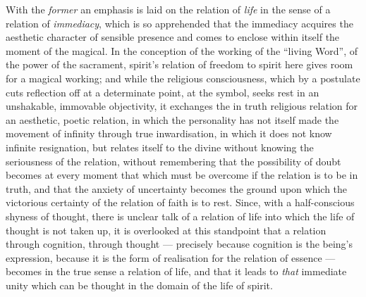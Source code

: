 \documentclass[12pt,a4paper]{book}
\begin{document}
With the \emph{former} an emphasis is laid on the relation of \emph{life} in
the sense of a relation of \emph{immediacy}, which is so apprehended that the
immediacy acquires the aesthetic character of sensible presence and comes to
enclose within itself the moment of the magical. In the conception of the
working of the ``living Word'', of the power of the sacrament,
spirit's relation of freedom to spirit here gives room for a magical working;
and while the religious consciousness, which by a postulate cuts reflection
off at a determinate point, at the symbol, seeks rest in an unshakable,
immovable objectivity, it exchanges the in truth religious relation for an
aesthetic, poetic relation, in which the personality has not itself made the
movement of infinity through true inwardisation, in which it does not know
infinite resignation, but relates itself to the divine without knowing the
seriousness of the relation, without remembering that the possibility of doubt
becomes at every moment that which must be overcome if the relation is to be
in truth, and that the anxiety of uncertainty becomes the ground upon which
the victorious certainty of the relation of faith is to rest. Since, with a
half-conscious shyness of thought, there is unclear talk of a relation of life
into which the life of thought is not taken up, it is overlooked at this
standpoint that a relation through cognition, through thought --- precisely
because cognition is the being's expression, because it is the form of
realisation for the relation of essence --- becomes in the true sense a
relation of life, and that it leads to \emph{that} immediate unity which can
be thought in the domain of the life of spirit.
\end{document}
